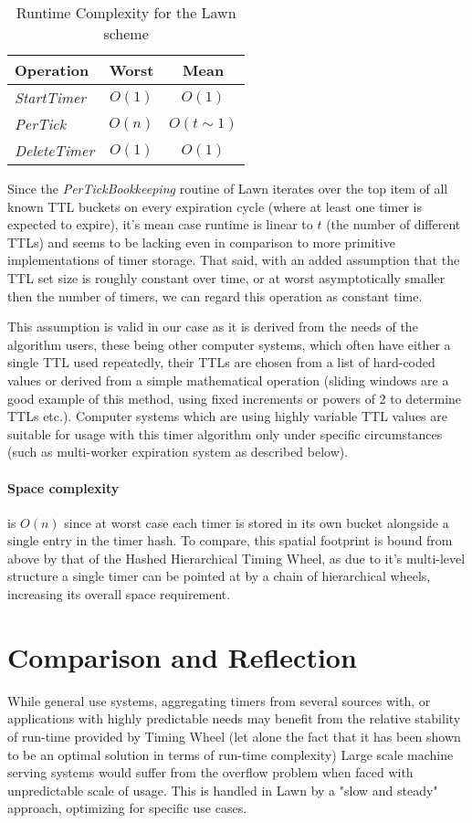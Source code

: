 \documentclass[conference]{IEEEtran}
\newcommand{\complexity}[9]{
\begin{table}[ht]
	\begin{center}
		\begin{tabular}{l|c|c}
			\textbf{Operation} & \textbf{#1} & \textbf{#2} \\
			\hline
			\textit{StartTimer} & $O(#3)$ & $O(#4)$ \\
			\textit{PerTick} & $O(#5)$ & $O(#6)$ \\
			\textit{DeleteTimer} &  $O(#7)$ & $O(#8)$ \\
		\end{tabular}
		\linebreak
		\caption{Runtime Complexity for #9}
	\end{center}
\end{table}
}
\begin{document}
\complexity{Worst}{Mean}{1}{1}{n}{t\sim1}{1}{1}{the Lawn scheme}

Since the \textit{PerTickBookkeeping} routine of Lawn iterates over the top item of all known TTL buckets on every expiration cycle (where at least one timer is expected to expire), it's mean case runtime is linear to $t$ (the number of different TTLs) and seems to be lacking even in comparison to more primitive implementations of timer storage. That said, with an added assumption that the TTL set size is roughly constant over time, or at worst asymptotically smaller then the number of timers, we can regard this operation as constant time.

This assumption is valid in our case as it is derived from the needs of the algorithm users, these being other computer systems, which often have either a single TTL used repeatedly, their TTLs are chosen from a list of hard-coded values or derived from a simple mathematical operation (sliding windows are a good example of this method, using fixed increments or powers of 2 to determine TTLs etc.). Computer systems which are using highly variable TTL values are suitable for usage with this timer algorithm only under specific circumstances (such as multi-worker expiration system as described below).


\paragraph{Space complexity} is $O(n)$ since at worst case each timer is stored in its own bucket alongside a single entry in the timer hash. To compare, this spatial footprint is bound from above by that of the Hashed Hierarchical Timing Wheel, as due to it's multi-level structure a single timer can be pointed at by a chain of hierarchical wheels, increasing its overall space requirement.

\section{Comparison and Reflection}
While general use systems, aggregating timers from several sources with, or applications with highly predictable needs may benefit from the relative stability of run-time provided by Timing Wheel (let alone the fact that it has been shown to be an optimal solution in terms of run-time complexity) Large scale machine serving systems would suffer from the overflow problem when faced with unpredictable scale of usage. This is handled in Lawn by a "slow and steady" approach, optimizing for specific use cases.
\end{document}
